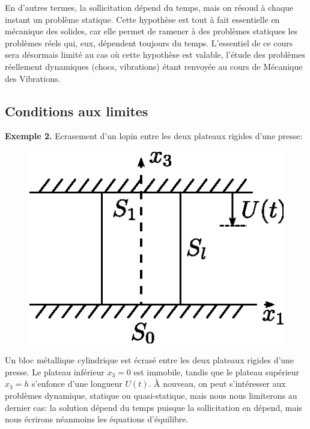 \begin{enumerate}
        En d'autres termes, la sollicitation dépend du temps, mais on résoud à chaque instant un problème statique.
        Cette hypothèse est tout à fait essentielle en mécanique des solides, car elle permet de ramener à des problèmes statiques les problèmes réels qui, eux, dépendent toujours du temps.
        L'essentiel de ce cours sera désormais limité au cas où cette hypothèse est valable, l'étude des problèmes réellement dynamiques (chocs, vibrations) étant renvoyée au cours de Mécanique des Vibrations.
\end{enumerate}
\subsection{Conditions aux limites} \label{ssec:Ch4-1.2}
\textbf{Exemple 2.} Ecrasement d'un lopin entre les deux plateaux rigides d'une presse:
\begin{figure}
    \begin{center}
        \includegraphics{../images/T1_Ch04-0002}
    \end{center}
\end{figure}
Un bloc métallique cylindrique est écrasé entre les deux plateaux rigides d'une presse.
Le plateau inférieur $x_3 =0$ est immobile, tandis que le plateau supérieur $x_3 =h$ s'enfonce d'une longueur $U(t)$.
À nouveau, on peut s'intéresser aux problèmes dynamique, statique ou quasi-statique, mais nous nous limiterons au dernier cas: la solution dépend du temps puisque la sollicitation en dépend, mais nous écrirons néanmoins les équations d'équilibre.

